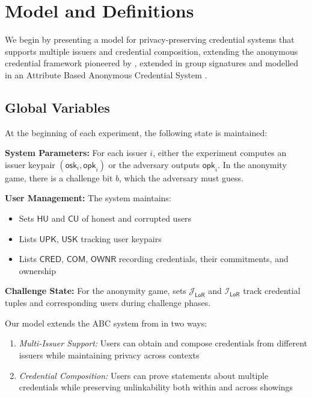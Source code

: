 \section{Model and Definitions}
We begin by presenting a model for privacy-preserving credential systems that supports multiple issuers and credential composition, extending the anonymous credential framework pioneered by \cite{hutchison_signature_2004}, extended in group signatures \cite{hutchison_foundations_2005} and modelled in an Attribute Based Anonymous Credential System \cite{fuchsbauer_structure-preserving_2019}.

\subsection{Global Variables}
At the beginning of each experiment, the following state is maintained:

\noindent \textbf{System Parameters:} For each issuer $i$, either the experiment computes an issuer keypair $(\mathsf{osk}_i, \mathsf{opk}_i)$ or the adversary outputs $\mathsf{opk}_i$. In the anonymity game, there is a challenge bit $b$, which the adversary must guess.

\noindent \textbf{User Management:} The system maintains:
\begin{itemize}
\item Sets $\mathsf{HU}$ and $\mathsf{CU}$ of honest and corrupted users
\item Lists $\mathsf{UPK}$, $\mathsf{USK}$ tracking user keypairs
\item Lists $\mathsf{CRED}$, $\mathsf{COM}$, $\mathsf{OWNR}$ recording credentials, their commitments, and ownership
\end{itemize}

\noindent \textbf{Challenge State:} For the anonymity game, sets $\mathcal{J}_{\mathsf{LoR}}$ and $\mathcal{I}_{\mathsf{LoR}}$ track credential tuples and corresponding users during challenge phases.

\noindent  Our model extends the ABC system from \cite{fuchsbauer_structure-preserving_2019} in two ways:
\begin{enumerate}
    \item \textit{Multi-Issuer Support:} Users can obtain and compose credentials from different issuers while maintaining privacy across contexts
    \item \textit{Credential Composition:} Users can prove statements about multiple credentials while preserving unlinkability both within and across showings
\end{enumerate}


